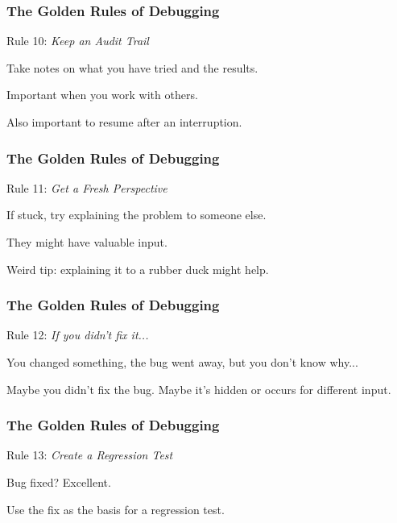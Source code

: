 \begin{frame}
\frametitle{The Golden Rules of Debugging}
\begin{changemargin}{1cm}

Rule 10: \emph{Keep an Audit Trail}

Take notes on what you have tried and the results.

Important when you work with others.

Also important to resume after an interruption.

\end{changemargin}
\end{frame}

\begin{frame}
\frametitle{The Golden Rules of Debugging}
\begin{changemargin}{1cm}

Rule 11: \emph{Get a Fresh Perspective}

If stuck, try explaining the problem to someone else.

They might have valuable input. 

Weird tip: explaining it to a rubber duck might help. 

\end{changemargin}
\end{frame}

\begin{frame}
\frametitle{The Golden Rules of Debugging}
\begin{changemargin}{1cm}

Rule 12: \emph{If you didn't fix it...}

You changed something, the bug went away, but you don't know why...

Maybe you didn't fix the bug. Maybe it's hidden or occurs for different input.

\end{changemargin}
\end{frame}

\begin{frame}
\frametitle{The Golden Rules of Debugging}
\begin{changemargin}{1cm}

Rule 13: \emph{Create a Regression Test}

Bug fixed? Excellent.

Use the fix as the basis for a regression test.

\end{changemargin}
\end{frame}





